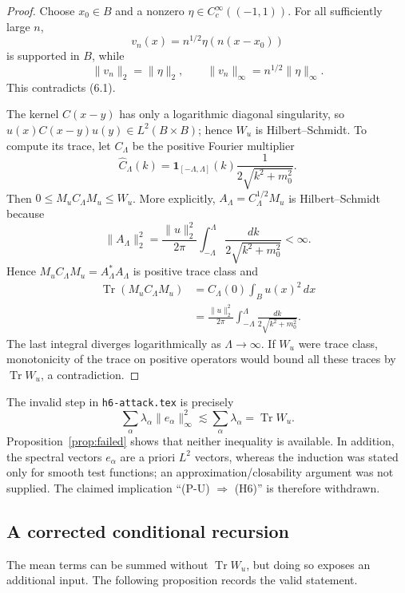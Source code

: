 \documentclass[11pt,a4paper]{article}
\theoremstyle{remark}
\DeclareMathOperator{\Tr}{Tr}
\begin{document}
\begin{proof}
Choose $x_0\in B$ and a nonzero $\eta\in C_c^\infty((-1,1))$.  For all sufficiently large $n$,
\[
 v_n(x)=n^{1/2}\eta(n(x-x_0))
\]
is supported in $B$, while
\[
 \|v_n\|_2=\|\eta\|_2,
 \qquad \|v_n\|_\infty=n^{1/2}\|\eta\|_\infty.
\]
This contradicts (6.1).

The kernel $C(x-y)$ has only a logarithmic diagonal singularity, so
$u(x)C(x-y)u(y)\in L^2(B\times B)$; hence $W_u$ is Hilbert--Schmidt.  To compute its trace, let
$C_\Lambda$ be the positive Fourier multiplier
\[
 \widehat C_\Lambda(k)
 =\mathbf1_{[-\Lambda,\Lambda]}(k)\frac1{2\sqrt{k^2+m_0^2}}.
\]
Then $0\le M_uC_\Lambda M_u\le W_u$.  More explicitly,
$A_\Lambda=C_\Lambda^{1/2}M_u$ is Hilbert--Schmidt because
\[
 \|A_\Lambda\|_2^2
 =\frac{\|u\|_2^2}{2\pi}
   \int_{-\Lambda}^{\Lambda}\frac{dk}{2\sqrt{k^2+m_0^2}}<\infty.
\]
Hence $M_uC_\Lambda M_u=A_\Lambda^*A_\Lambda$ is positive trace class and
\begin{align*}
 \Tr(M_uC_\Lambda M_u)
 &=C_\Lambda(0)\int_Bu(x)^2\,dx\\
 &=\frac{\|u\|_2^2}{2\pi}
   \int_{-\Lambda}^{\Lambda}\frac{dk}{2\sqrt{k^2+m_0^2}}.
\end{align*}
The last integral diverges logarithmically as $\Lambda\to\infty$.  If $W_u$ were trace class,
monotonicity of the trace on positive operators would bound all these traces by $\Tr W_u$, a
contradiction.
\end{proof}

The invalid step in \texttt{h6-attack.tex} is precisely
\[
 \sum_\alpha\lambda_\alpha\|e_\alpha\|_\infty^2
 \lesssim\sum_\alpha\lambda_\alpha=\Tr W_u.
\]
Proposition~\ref{prop:failed} shows that neither inequality is available.  In addition, the
spectral vectors $e_\alpha$ are a priori $L^2$ vectors, whereas the induction was stated only for
smooth test functions; an approximation/closability argument was not supplied.  The claimed
implication ``(P-U) $\Rightarrow$ (H6)'' is therefore withdrawn.

\subsection{A corrected conditional recursion}

The mean terms can be summed without $\Tr W_u$, but doing so exposes an additional input.  The
following proposition records the valid statement.
\end{document}
